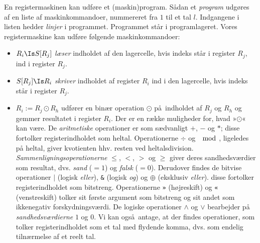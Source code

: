 En registermaskinen kan udføre et (maskin)program.
Sådan et \emph{program}
udgøres af en liste af maskinkommandoer,
nummereret fra $1$ til et tal $l$.
Indgangene i listen hedder \emph{linjer}
i programmet.
Programmet står i programlageret.
Vores registermaskine kan udføre følgende maskinkommandoer:
\begin{itemize}
  \item $R_i\Is S[R_j]$ \emph{læser}
    indholdet af den lagercelle, hvis indeks står i register $R_j$, ind i register $R_j$.
  \item $S[R_j]\Is R_i$ \emph{skriver}
    indholdet af register $R_i$ ind i den lagercelle, hvis indeks står i register $R_j$.
  \item $R_i := R_j\odot R_h$ udfører en binær operation $\odot$ på indholdet af $R_j$ og $R_h$ og gemmer resultatet i register $R_i$.
    Der er en række muligheder for, hvad  »$\odot$« kan være.
    De \emph{aritmetiske}
    operationer er som sædvanligt $+$, $-$ og $*$; disse fortolker registerindholdet som heltal.
    Operationerne $\div$ og $\mod$,
    ligeledes på heltal, giver kvotienten hhv. resten ved heltalsdivision.
    \emph{Sammenligningsoperationerne}
    $\leq$, $<$, $>$ og $\geq$ giver deres sandhedsværdier som resultat, dvs. \emph{sand} ($=1$) og \emph{falsk}  ($=0$).
    Derudover findes de bitvise operationer $|$ (logisk \emph{eller}), \texttt{\&} (logisk \emph{og}) og $\oplus$ (eksklusiv \emph{eller}). disse fortolker registerindholdet som bitstreng.
    Operationerne \texttt{»} (højreskift) og \texttt{«} (venstreskift) tolker sit første argument som bitstreng og sit andet som ikkenegativ forskydningsværdi.
    De logiske operationer $\wedge$ og $\vee$ bearbejder på \emph{sandhedsværdierne} $1$ og $0$.
    Vi kan også antage, at der findes operationer, som tolker registerindholdet som et tal med flydende komma, dvs. som endelig tilnærmelse af et reelt tal.

\end{itemize}
